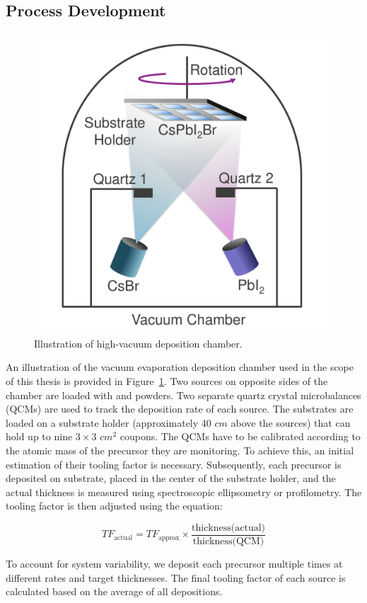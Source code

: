\subsection{Process Development}


\begin{figure}
  \centering
  \medskip
  \includegraphics[width=.5\textwidth]{chapters/material_properties/images/Chamber.pdf}
  \caption[Short caption for Table of Figures]{Illustration of high-vacuum deposition chamber.}
  \label{fig:deposition_chamber}
\end{figure}


An illustration of the vacuum evaporation deposition chamber used in the scope of this thesis is provided in Figure~\ref{fig:deposition_chamber}. Two sources on opposite sides of the chamber are loaded with  and  powders. Two separate quartz crystal microbalances (QCMs) are used to track the deposition rate of each source. The substrates are loaded on a substrate holder (approximately 40 $cm$ above the sources) that can hold up to nine $3\times 3$ $cm^2$ coupons. The QCMs have to be calibrated according to the atomic mass of the precursor they are monitoring. To achieve this, an initial estimation of their tooling factor is necessary. Subsequently, each precursor is deposited on  substrate, placed in the center of the substrate holder, and the actual thickness is measured using spectroscopic ellipsometry or profilometry. The tooling factor is then adjusted using the equation: 

\begin{equation}
    TF_{\text{actual}} = TF_{\text{approx}} \times \frac{\text{thickness(actual)}}{\text{thickness(QCM)}}
\end{equation}

To account for system variability, we deposit each precursor multiple times at different rates and target thicknesses. The final tooling factor of each source is calculated based on the average of all depositions.


